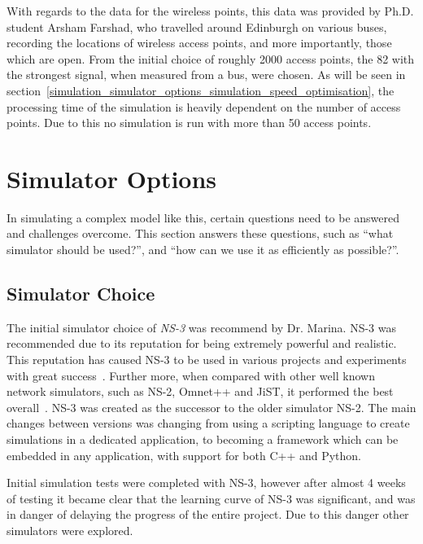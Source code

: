     With regards to the data for the wireless points, this data was provided by Ph.D. student Arsham Farshad, who travelled around Edinburgh on various buses, recording the locations of wireless access points, and more importantly, those which are open. From the initial choice of roughly 2000 access points, the 82 with the strongest signal, when measured from a bus, were chosen. As will be seen in section~\ref{simulation_simulator_options_simulation_speed_optimisation}, the processing time of the simulation is heavily dependent on the number of access points. Due to this no simulation is run with more than 50 access points. 

    \section{Simulator Options}\label{simulation_simulator_options}

        In simulating a complex model like this, certain questions need to be answered and challenges overcome. This section answers these questions, such as ``what simulator should be used?'', and ``how can we use it as efficiently as possible?''. 

        \subsection{Simulator Choice}\label{simulation_simulator_options_simulator_choice}

            The initial simulator choice of \emph{NS-3} was recommend by Dr. Marina. NS-3 was recommended due to its reputation for being extremely powerful and realistic. This reputation has caused NS-3 to be used in various projects and experiments with great success~\cite{highperformancesimulatorofadhocnetworks}.  Further more, when compared with other well known network simulators, such as NS-2, Omnet++ and JiST, it performed the best overall~\cite{networksimulatorcomparison}. NS-3 was created as the successor to the older simulator NS-2. The main changes between versions was changing from using a scripting language to create simulations in a dedicated application, to becoming a framework which can be embedded in any application, with support for both C++ and Python. 

            Initial simulation tests were completed with NS-3, however after almost 4 weeks of testing it became clear that the learning curve of NS-3 was significant, and was in danger of delaying the progress of the entire project. Due to this danger other simulators were explored. 

